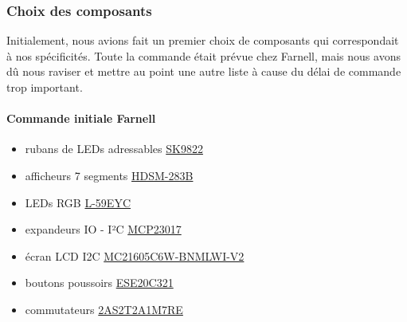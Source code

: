 \documentclass[12pt]{article}
\begin{document}
	\subsubsection{Choix des composants}
	Initialement, nous avions fait un premier choix de composants qui correspondait à nos spécificités. Toute la commande était prévue chez Farnell, mais nous avons dû nous raviser et mettre au point une autre liste à cause du délai de commande trop important.\\
	\paragraph{Commande initiale Farnell}
	\begin{itemize}[label=$-$]
		\item rubans de LEDs adressables \href{https://fr.aliexpress.com/item/1005006918408592.html?spm=a2g0o.productlist.main.19.fbb0788296kxRo&algo_pvid=72d2c9a9-ec47-4e4b-9d14-7e90be35485c&algo_exp_id=72d2c9a9-ec47-4e4b-9d14-7e90be35485c-9&pdp_npi=4%40dis!EUR!18.92!18.92!!!145.68!145.68!%402103888a17169934968957029e0b2f!12000038723750387!sea!FR!0!AB&curPageLogUid=lAauznpLAY1Y&utparam-url=scene%3Asearch%7Cquery_from%3A}{SK9822}\\
		\item afficheurs 7 segments \href{https://fr.farnell.com/broadcom-limited/hdsm-283b/afficheur-a-led-cms-7mm-bleu-cc/dp/1659312}{HDSM-283B}\\
		\item LEDs RGB \href{https://fr.farnell.com/kingbright/l-59eyc/led-5mm-tricolore/dp/1168662}{L-59EYC}\\
		\item expandeurs IO - I²C \href{https://fr.farnell.com/microchip/mcp23017-e-sp/16-bit-expander-i-o-i2c-i-f/dp/1332088}{MCP23017}\\
		\item écran LCD I2C \href{https://fr.farnell.com/midas/mc21605c6w-bnmlwi-v2/afficheur-alphanumerique-16x2/dp/2748649}{MC21605C6W-BNMLWI-V2}\\
		\item boutons poussoirs \href{https://fr.farnell.com/panasonic/ese20c321/commutateur-bouton-pouss-momentane/dp/2079613}{ESE20C321}\\
		\item commutateurs \href{https://fr.farnell.com/multicomp/2as2t2a1m7re/switch-toggle-spdt-on-mom/dp/1550118}{2AS2T2A1M7RE}\\
	\end{itemize}
\end{document}
